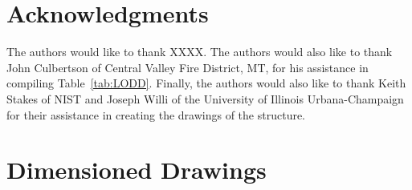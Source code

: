 \documentclass[12pt,oneside]{book}
\begin{document}


\chapter*{Acknowledgments}

The authors would like to thank XXXX. The authors would also like to thank John Culbertson of Central Valley Fire District, MT, for his assistance in compiling Table~\ref{tab:LODD}. Finally, the authors would also like to thank Keith Stakes of NIST and Joseph Willi of the University of Illinois Urbana-Champaign for their assistance in creating the drawings of the structure.



\appendix

\chapter{Dimensioned Drawings}
\label{sec:drawings}
\end{document}
